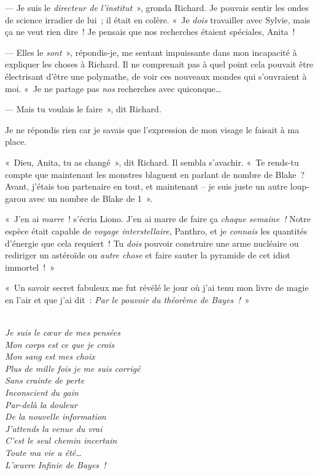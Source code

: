 --- Je suis le \emph{directeur de l'institut}~», gronda Richard. Je pouvais sentir les ondes de science irradier de lui~; il était en colère. «~Je \emph{dois} travailler avec Sylvie, mais ça ne veut rien dire~! Je pensais que nos recherches étaient spéciales, Anita~!

--- Elles le \emph{sont}~», répondis-je, me sentant impuissante dans mon incapacité à expliquer les choses à Richard. Il ne comprenait pas à quel point cela pouvait être électrisant d'être une polymathe, de voir ces nouveaux mondes qui s'ouvraient à moi. «~Je ne partage pas \emph{nos} recherches avec quiconque…

--- Mais tu voulais le faire~», dit Richard.

Je ne répondis rien car je savais que l'expression de mon visage le faisait à ma place.

«~Dieu, Anita, tu as changé~», dit Richard. Il sembla s'avachir. «~Te rends-tu compte que maintenant les monstres blaguent en parlant de nombre de Blake~? Avant, j'étais ton partenaire en tout, et maintenant -- je suis juste un autre loup-garou avec un nombre de Blake de 1~».


«~J'en ai \emph{marre}~! s'écria Liono. J'en ai marre de faire ça \emph{chaque semaine~!} Notre espèce était capable de \emph{voyage interstellaire}, Panthro, et je \emph{connais} les quantités d'énergie que cela requiert~! Tu \emph{dois} pouvoir construire une arme nucléaire ou rediriger un astéroïde ou \emph{autre chose} et faire sauter la pyramide de cet idiot immortel~!~»

\clearpage
{}

«~Un savoir secret fabuleux me fut révélé le jour où j'ai tenu mon livre de magie en l'air et que j'ai dit~: \emph{Par le pouvoir du théorème de Bayes~!}~»


\emph{
\\
Je suis le cœur de mes pensées\\
Mon corps est ce que je crois\\
Mon sang est mes choix\\
Plus de mille fois je me suis corrigé\\
Sans crainte de perte\\
Inconscient du gain\\
Par-delà la douleur\\
De la nouvelle information\\
J'attends la venue du vrai\\
C'est le seul chemin incertain\\
Toute ma vie a été…\\
L'œuvre Infinie de Bayes~!
}

